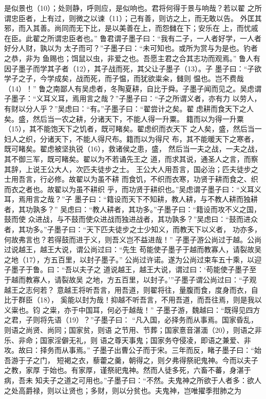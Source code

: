 \documentclass[12pt,UTF8]{ctexbook}
\begin{document}
是似景也（10）；处则静，呼则应，是似响也。君将何得于景与响哉？若以翟 
之所谓忠臣者，上有过，则微之以谏（11）；己有善，则访之上，而无敢以告。 
外匡其邪，而入其善。尚同而无下比，是以美善在上，而怨雠在下；安乐在 
上，而忧戚在臣。此翟之所谓忠臣者也。” 
鲁君谓子墨子曰：“我有二子，一人者好学，一人者好分人财，孰以为 
太子而可？”子墨子曰：“未可知也。或所为赏与为是也。钓者之恭，非为 
鱼赐也；饵鼠以虫，非爱之也。吾愿主君之合其志功而观焉。” 
鲁人有因子墨子而学其子者（12），其子战而死，其父让子墨子（13）。子 
墨子曰：“子欲学子之子，今学成矣，战而死，而子愠，而犹欲粜籴，雠则 
愠也。岂不费哉（14）！” 
鲁之南鄙人有吴虑者，冬陶夏耕，自比于舜。子墨子闻而见之。吴虑谓 
子墨子：“义耳义耳，焉用言之哉？”子墨子曰：“子之所谓义者，亦有力 
以劳人，有财以分人乎？”吴虑曰：“有。”子墨子曰：“翟尝计之矣。翟 
虑耕而食天下之人矣。盛，然后当一农之耕，分诸天下，不能人得一升粟。 
籍而以为得一升粟（15），其不能饱天下之饥者，既可睹矣。翟虑织而衣天下 
之人矣，盛，然后当一妇人之织，分诸天下，不能人得尺布。籍而以为得尺 
布，其不能暖天下之寒者，既可睹矣。翟虑被坚执锐（16），救诸侯之患，盛， 
然后当一夫之战，一夫之战，其不御三军，既可睹矣。翟以为不若诵先王之 
道，而求其说，通圣人之言，而察其辞，上说王公大人，次匹夫徒步之士。 
王公大人用吾言，国必治；匹夫徒步之士用吾言，行必修。故翟以为虽不耕 
而食饥，不织而衣寒，功贤于耕而食之、织而衣之者也。故翟以为虽不耕织 
乎，而功贤于耕织也。”吴虑谓子墨子曰：“义耳义耳，焉用言之哉？”子 
墨子曰：“籍设而天下不知耕，教人耕，与不教人耕而独耕者，其功孰多？” 
吴虑曰：“教人耕者，其功多。”子墨子曰：“籍设而攻不义之国，鼓而使 
众进战，与不鼓而使众进战而独进战者，其功孰多？”吴虑曰：“鼓而进众 
者，其功多。”子墨子曰：“天下匹夫徒步之士少知义，而教天下以义者， 
功亦多，何故弗言也？若得鼓而进于义，则吾义岂不益进哉！” 
子墨子游公尚过于越。公尚过说越王，越王大说，谓公尚过曰：“先生 
苟能使子墨子于越而教寡人，请裂故吴之地（17），方五百里，以封子墨子。” 
公尚过许诺。遂为公尚过束车五十乘，以迎子墨子于鲁。曰：“吾以夫子之 
道说越王，越王大说，谓过曰：‘苟能使子墨子至于越而教寡人，请裂故吴 
之地，方五百里，以封子。’”子墨子谓公尚过曰：“子观越王之志何若？ 
意越王将听吾言，用吾道，则翟将往，量腹而食，度身而衣，自比于群臣（18）， 
奚能以封为哉！抑越不听吾言，不用吾道，而吾往焉，则是我以义粜也。钧 
之粜，亦于中国耳，何必于越哉！” 
子墨子游，魏越曰：“既得见四方之君，子则将先语（19）？”子墨子曰： 
“凡入国，必择务而从事焉。国家昏乱，则语之尚贤、尚同；国家贫，则语 
之节用、节葬；国家憙音湛湎（20），则语之非乐、非命；国家淫僻无礼，则 
语之尊天事鬼；国家务夺侵凌，即语之兼爱、非攻。故曰：择务而从事焉。” 
子墨子出曹公子而于宋。三年而反，睹子墨子曰：“始吾游于子之门， 
短褐之衣，藜藿之羹，朝得之，则夕弗得祭祀鬼神。今而以夫子之教，家厚 
于始也。有家厚，谨祭祀鬼神。然而人徒多死，六畜不蕃，身湛于病，吾未 
知夫子之道之可用也。”子墨子曰：“不然。夫鬼神之所欲于人者多：欲人 
之处高爵禄，则以让贤也；多财，则以分贫也。夫鬼神，岂唯擢季拑肺之为 
\end{document}
